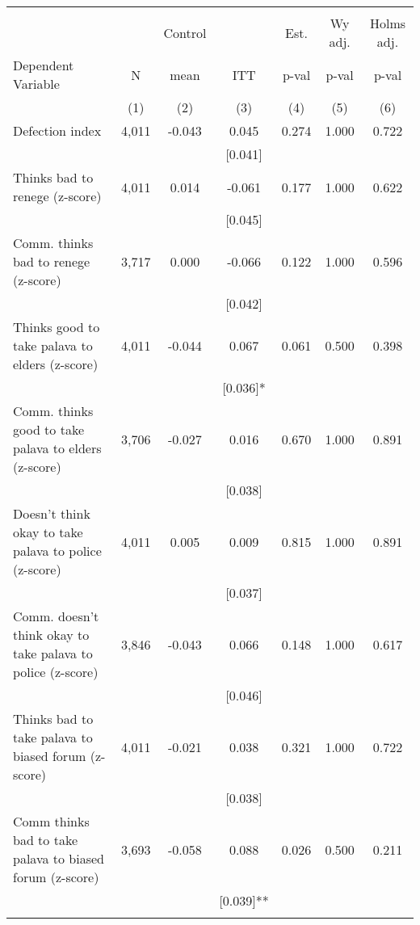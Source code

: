 \begin{tabular}{lcccccc}
\hline \noalign{\smallskip} &  &  &  &  &  & \\
 &  & Control &  & Est. & Wy adj. & Holms adj.\\
Dependent Variable & N & mean & ITT & p-val & p-val & p-val\\
 & (1) & (2) & (3) & (4) & (5) & (6)\\
\noalign{\smallskip}\hline \noalign{\smallskip}Defection index & 4,011 & -0.043 & 0.045 & 0.274 & 1.000 & 0.722\\
 &  &  & [0.041] &  &  & \\
\quad Thinks bad to renege (z-score) & 4,011 & 0.014 & -0.061 & 0.177 & 1.000 & 0.622\\
 &  &  & [0.045] &  &  & \\
\quad Comm. thinks bad to renege (z-score) & 3,717 & 0.000 & -0.066 & 0.122 & 1.000 & 0.596\\
 &  &  & [0.042] &  &  & \\
\quad Thinks good to take palava to elders (z-score) & 4,011 & -0.044 & 0.067 & 0.061 & 0.500 & 0.398\\
 &  &  & [0.036]* &  &  & \\
\quad Comm. thinks good to take palava to elders (z-score) & 3,706 & -0.027 & 0.016 & 0.670 & 1.000 & 0.891\\
 &  &  & [0.038] &  &  & \\
\quad Doesn't think okay to take palava to police (z-score) & 4,011 & 0.005 & 0.009 & 0.815 & 1.000 & 0.891\\
 &  &  & [0.037] &  &  & \\
\quad Comm. doesn't think okay to take palava to police (z-score) & 3,846 & -0.043 & 0.066 & 0.148 & 1.000 & 0.617\\
 &  &  & [0.046] &  &  & \\
\quad Thinks bad to take palava to biased forum (z-score) & 4,011 & -0.021 & 0.038 & 0.321 & 1.000 & 0.722\\
 &  &  & [0.038] &  &  & \\
\quad Comm thinks bad to take palava to biased forum (z-score) & 3,693 & -0.058 & 0.088 & 0.026 & 0.500 & 0.211\\
 &  &  & [0.039]** &  &  & \\
\noalign{\smallskip}\hline\end{tabular}
